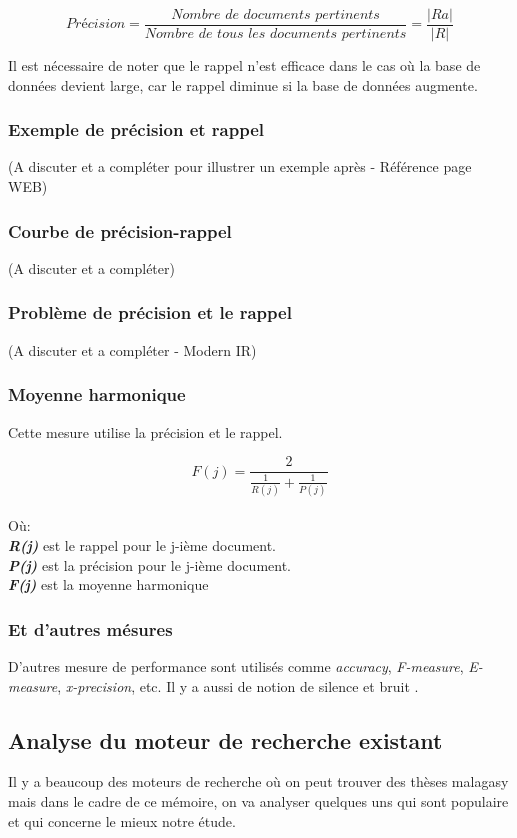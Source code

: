 \[
	Précision = \frac{\textit{Nombre de documents pertinents}}{\textit{Nombre de tous les documents pertinents}} = \frac{|Ra|}{|R|}
\]

Il est nécessaire de noter que le rappel n'est efficace dans le cas où la base de données devient large, car le rappel diminue si la base de données augmente. 

\subsubsection{Exemple de précision et rappel}
(A discuter et a compléter pour illustrer un exemple après - Référence page WEB)

\subsubsection{Courbe de précision-rappel}
(A discuter et a compléter)

\subsubsection{Problème de précision et le rappel}
(A discuter et a compléter - Modern IR)

\subsubsection{Moyenne harmonique}
Cette mesure utilise la précision et le rappel.

\[
	F(j) = \frac{2}{\frac{1}{R(j)} + \frac{1}{P(j)}}
\]
\\Où:\\
\textbf{\textit{R(j)}} est le rappel pour le j-ième document.\\
\textbf{\textit{P(j)}} est la précision pour le j-ième document.\\
\textbf{\textit{F(j)}} est la moyenne harmonique

\subsubsection{Et d'autres mésures}
D'autres mesure de performance sont utilisés comme \textit{accuracy}, \textit{F-measure}, \textit{E-measure}, \textit{x-precision}, etc. Il y a aussi de notion de silence et bruit \citep*{modern-ir, amelioration-ri-approche-semantique}.

\subsection{Analyse du moteur de recherche existant}
Il y a beaucoup des moteurs de recherche où on peut trouver des thèses malagasy mais dans le cadre de ce mémoire, on va analyser quelques uns qui sont populaire et qui concerne le mieux notre étude.

